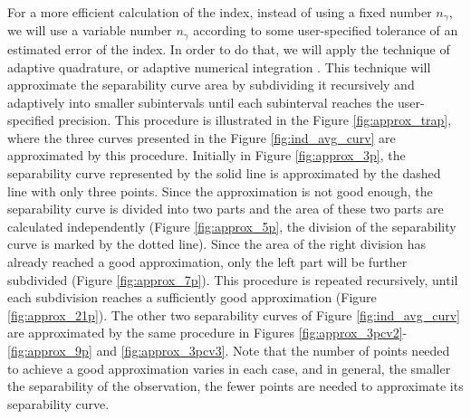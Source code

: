 For a more efficient calculation of the index, instead of using a fixed number $n_{\gamma}$, we will use a variable number $n_{\gamma}$ according to some user-specified tolerance of an estimated error of the index. In order to do that, we will apply the technique of adaptive quadrature, or adaptive numerical integration \cite{kuncir1962,gonnet2012,burden2016}. This technique will approximate the separability curve area by subdividing it recursively and adaptively into smaller subintervals until each subinterval reaches the user-specified precision. This procedure is illustrated in the Figure \ref{fig:approx_trap}, where the three curves presented in the Figure \ref{fig:ind_avg_curv} are approximated by this procedure. Initially in Figure \ref{fig:approx_3p}, the separability curve represented by the solid line is approximated by the dashed line with only three points. Since the approximation is not good enough, the separability curve is divided into two parts and the area of these two parts are calculated independently (Figure \ref{fig:approx_5p}, the division of the separability curve is marked by the dotted line). Since the area of the right division has already reached a good approximation, only the left part will be further subdivided (Figure \ref{fig:approx_7p}). This procedure is repeated recursively, until each subdivision reaches a sufficiently good approximation (Figure \ref{fig:approx_21p}). The other two separability curves of Figure \ref{fig:ind_avg_curv} are approximated by the same procedure in Figures \ref{fig:approx_3pcv2}-\ref{fig:approx_9p} and \ref{fig:approx_3pcv3}. Note that the number of points needed to achieve a good approximation varies in each case, and in general, the smaller the separability of the observation, the fewer points are needed to approximate its separability curve.

